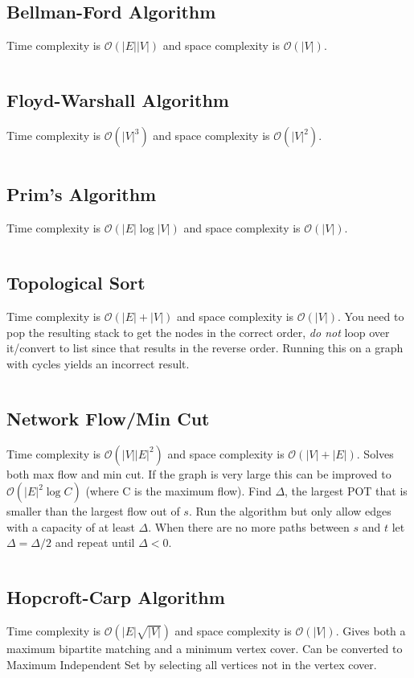 \documentclass[8pt,a4paper,landscape,oneside]{amsart}
\newcommand{\code}[1]{\inputminted[fontsize=\normalsize,baselinestretch=1]{java}{code/#1}}
\newcommand{\bigO}{\mathcal{O}}
\begin{document}
\begin{multicols*}{3}
  \subsection{Bellman-Ford Algorithm}
  Time complexity is $\bigO(|E||V|)$ and space complexity is $\bigO(|V|)$.
  \code{Graphs/BellmanFord.java}
  
  \subsection{Floyd-Warshall Algorithm}
  Time complexity is $\bigO(|V|^3)$ and space complexity is $\bigO(|V|^2)$.
  \code{Graphs/FloydWarshall.java}
  
  \subsection{Prim's Algorithm}
  Time complexity is $\bigO(|E| \log{|V|})$ and space complexity is $\bigO(|V|)$.
  \code{Graphs/MST.java}
  
  \subsection{Topological Sort}
  Time complexity is $\bigO(|E| + |V|)$ and space complexity is $\bigO(|V|)$. You need to pop the resulting stack to get the nodes in the correct order, \textit{do not} loop over it/convert to list since that results in the reverse order. Running this on a graph with cycles yields an incorrect result.
  \code{Graphs/TopologicalSort.java}
  
  \subsection{Network Flow/Min Cut}
  Time complexity is $\bigO(|V||E|^2)$ and space complexity is $\bigO(|V|+|E|)$. Solves both max flow and min cut. If the graph is very large this can be improved to $\bigO(|E|^2 \log{C})$ (where C is the maximum flow). Find $\Delta$, the largest POT that is smaller than the largest flow out of $s$. Run the algorithm but only allow edges with a capacity of at least $\Delta$. When there are no more paths between $s$ and $t$ let $\Delta = \Delta / 2$ and repeat until $\Delta < 0$.
  \code{Graphs/NetworkFlow.java}
  
  \subsection{Hopcroft-Carp Algorithm}
  Time complexity is $\bigO(|E|\sqrt{|V|})$ and space complexity is $\bigO(|V|)$. Gives both a maximum bipartite matching and a minimum vertex cover. Can be converted to Maximum Independent Set by selecting all vertices not in the vertex cover.
  \code{Graphs/HopcroftCarp.java}
  

\end{multicols*}
\end{document}
